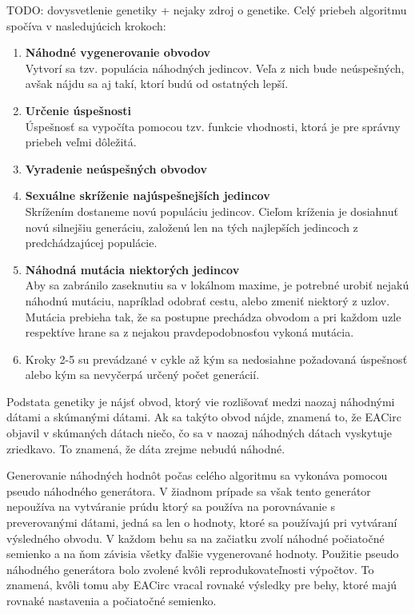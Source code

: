 TODO: dovysvetlenie genetiky + nejaky zdroj o genetike. Celý priebeh algoritmu spočíva v nasledujúcich krokoch:\vspace{-10pt}
\begin{enumerate}
	\item \textbf{Náhodné vygenerovanie obvodov}\\Vytvorí sa tzv. populácia náhodných jedincov. Veľa z nich bude neúspešných, avšak nájdu sa aj takí, ktorí budú od ostatných lepší. 
	\item \textbf{Určenie úspešnosti}\\Úspešnosť sa vypočíta pomocou tzv. funkcie vhodnosti, ktorá je pre správny priebeh veľmi dôležitá.
	\item \textbf{Vyradenie neúspešných obvodov}
	\item \textbf{Sexuálne skríženie najúspešnejších jedincov}\\Skrížením dostaneme novú populáciu jedincov. Cieľom kríženia je dosiahnuť novú silnejšiu generáciu, založenú len na tých najlepších jedincoch z predchádzajúcej populácie.
	\item \textbf{Náhodná mutácia niektorých jedincov}\\Aby sa zabránilo zaseknutiu sa v lokálnom maxime, je potrebné urobiť nejakú náhodnú mutáciu, napríklad odobrať cestu, alebo zmeniť niektorý z uzlov. Mutácia prebieha tak, že sa postupne prechádza obvodom a pri každom uzle respektíve hrane sa z nejakou pravdepodobnosťou vykoná mutácia.
	\item Kroky 2-5 su prevádzané v cykle až kým sa nedosiahne požadovaná úspešnosť alebo kým sa nevyčerpá určený počet generácií.
\end{enumerate}
Podstata genetiky je nájsť obvod, ktorý vie rozlišovať medzi naozaj náhodnými dátami a skúmanými dátami. Ak sa takýto obvod nájde, znamená to, že EACirc objavil v skúmaných dátach niečo, čo sa v naozaj náhodných dátach vyskytuje zriedkavo. To znamená, že dáta zrejme nebudú náhodné.

Generovanie náhodných hodnôt počas celého algoritmu sa vykonáva pomocou pseudo náhodného generátora. V žiadnom prípade sa však tento generátor nepoužíva na vytváranie prúdu ktorý sa používa na porovnávanie s preverovanými dátami, jedná sa len o hodnoty, ktoré sa používajú pri vytváraní výsledného obvodu. V každom behu sa na začiatku zvolí náhodné počiatočné semienko a na ňom závisia všetky ďalšie vygenerované hodnoty. Použitie pseudo náhodného generátora bolo zvolené kvôli reprodukovateľnosti výpočtov. To znamená, kvôli tomu aby EACirc vracal rovnaké výsledky pre behy, ktoré majú rovnaké nastavenia a počiatočné semienko.

